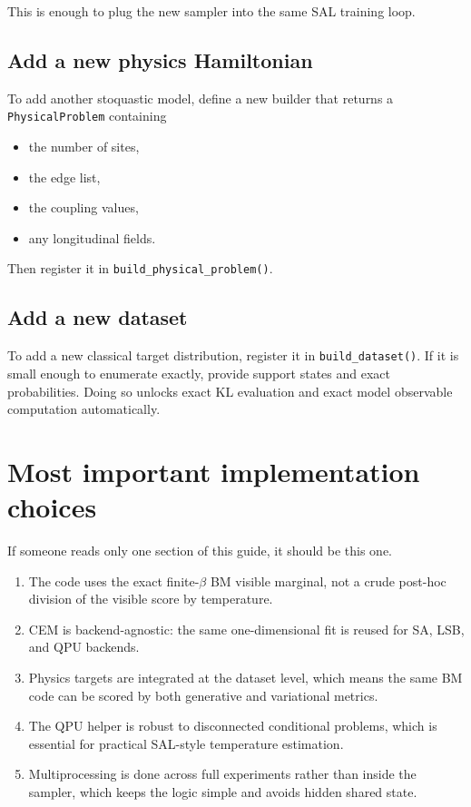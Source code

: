 \documentclass[11pt]{article}
\begin{document}
This is enough to plug the new sampler into the same SAL training loop.

\subsection{Add a new physics Hamiltonian}

To add another stoquastic model, define a new builder that returns a
\texttt{PhysicalProblem} containing
\begin{itemize}
  \item the number of sites,
  \item the edge list,
  \item the coupling values,
  \item any longitudinal fields.
\end{itemize}

Then register it in \texttt{build\_physical\_problem()}.

\subsection{Add a new dataset}

To add a new classical target distribution, register it in \texttt{build\_dataset()}.
If it is small enough to enumerate exactly, provide support states and exact
probabilities. Doing so unlocks exact KL evaluation and exact model observable
computation automatically.

\section{Most important implementation choices}

If someone reads only one section of this guide, it should be this one.

\begin{enumerate}
  \item The code uses the exact finite-$\beta$ BM visible marginal, not a crude
  post-hoc division of the visible score by temperature.
  \item CEM is backend-agnostic: the same one-dimensional fit is reused for SA,
  LSB, and QPU backends.
  \item Physics targets are integrated at the dataset level, which means the
  same BM code can be scored by both generative and variational metrics.
  \item The QPU helper is robust to disconnected conditional problems, which is
  essential for practical SAL-style temperature estimation.
  \item Multiprocessing is done across full experiments rather than inside the
  sampler, which keeps the logic simple and avoids hidden shared state.
\end{enumerate}
\end{document}

